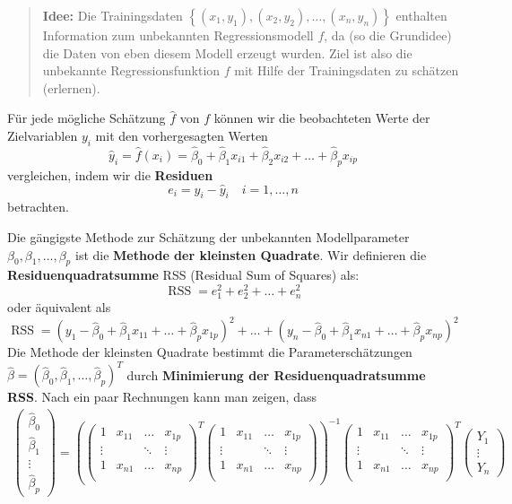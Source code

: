 \documentclass[
  ngerman,
]{book}
\begin{document}
\begin{quote}
\textbf{Idee:} Die Trainingsdaten \(\left\{(x_1,y_1),(x_2,y_2),\dots,(x_n,y_n)\right\}\) enthalten Information zum unbekannten Regressionsmodell \(f\), da (so die Grundidee) die Daten von eben diesem Modell erzeugt wurden. Ziel ist also die unbekannte Regressionsfunktion \(f\) mit Hilfe der Trainingsdaten zu schätzen (erlernen).
\end{quote}

Für jede mögliche Schätzung \(\hat{f}\) von \(f\) können wir die beobachteten Werte der Zielvariablen \(y_i\) mit den vorhergesagten Werten
\[
\hat{y}_i=\hat{f}(x_i)=\hat{\beta}_0 + \hat{\beta}_1 x_{i1} +  \hat{\beta}_2 x_{i2} + \dots + \hat{\beta}_p x_{ip}
\]
vergleichen, indem wir die \textbf{Residuen}
\[
e_i = y_i-\hat{y}_i\quad i=1,\dots,n
\]
betrachten.

Die gängigste Methode zur Schätzung der unbekannten Modellparameter \(\beta_0,\beta_1,\dots,\beta_p\) ist die \textbf{Methode der kleinsten Quadrate}. Wir definieren die \textbf{Residuenquadratsumme} RSS (Residual Sum of Squares) als:
\[
\operatorname{RSS}=e_1^2+e_2^2+\dots +e_n^2
\]
oder äquivalent als
\[
\operatorname{RSS}=
(y_1-\hat{\beta}_0 + \hat{\beta}_1 x_{11} +  \dots + \hat{\beta}_p x_{1p})^2 + 
\dots +
(y_n-\hat{\beta}_0 + \hat{\beta}_1 x_{n1} +  \dots + \hat{\beta}_p x_{np})^2
\]
Die Methode der kleinsten Quadrate bestimmt die Parameterschätzungen \(\hat{\beta}=(\hat{\beta}_0,\hat{\beta}_1,\dots,\hat{\beta}_p)^T\) durch \textbf{Minimierung der Residuenquadratsumme RSS}. Nach ein paar Rechnungen kann man zeigen, dass\\
\begin{align*}
\left(
  \begin{matrix}
  \hat{\beta}_0\\
  \hat{\beta}_1\\
  \vdots\\
  \hat{\beta}_p
  \end{matrix}
\right)=
\left(
  \left(\begin{matrix}
  1&x_{11}&\dots & x_{1p}\\
  \vdots&&\ddots & \vdots\\
  1&x_{n1}&\dots & x_{np}\\
  \end{matrix}\right)^T
  \left(\begin{matrix}
  1&x_{11}&\dots & x_{1p}\\
  \vdots&&\ddots & \vdots\\
  1&x_{n1}&\dots & x_{np}\\
  \end{matrix}\right)
\right)^{-1}
\left(\begin{matrix}
  1&x_{11}&\dots & x_{1p}\\
  \vdots&&\ddots & \vdots\\
  1&x_{n1}&\dots & x_{np}\\
  \end{matrix}\right)^T
\left(
  \begin{matrix}
  Y_1\\
  \vdots\\
  Y_n
  \end{matrix}
\right)
\end{align*}
\end{document}
